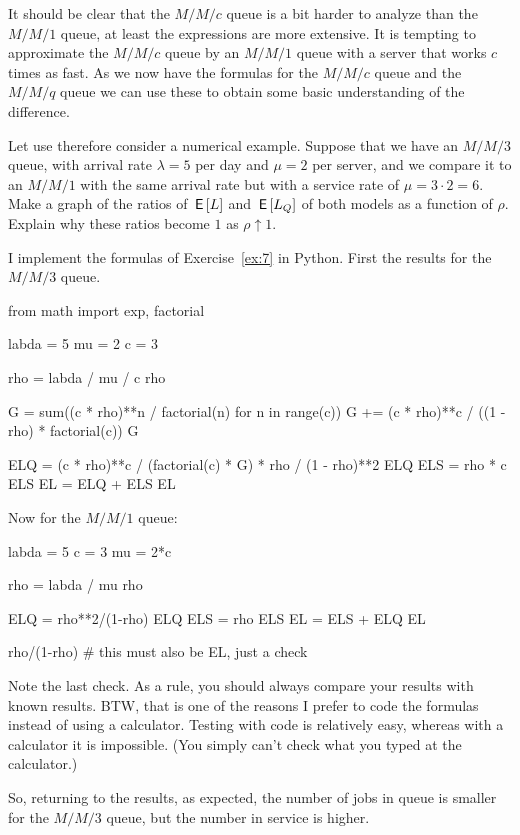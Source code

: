 \begin{exercise}\label{ex:27}
  It should be clear that the $M/M/c$ queue is a bit harder to analyze than the $M/M/1$ queue, at least the expressions are more extensive.
  It is tempting to approximate the $M/M/c$ queue by an $M/M/1$ queue with a server that works $c$ times as fast.
  As we now have the formulas for the $M/M/c$ queue and the $M/M/q$ queue we can use these to obtain some basic understanding of the difference.
  
  Let use therefore consider a numerical example.
  Suppose that we have an $M/M/3$ queue, with arrival rate $\lambda = 5$ per day and $\mu=2$ per server, and we compare it to an $M/M/1$ with the same arrival rate but with a service rate of $\mu = 3\cdot 2 = 6$.
  Make a graph of the ratios of $\,\mathsf{E}\left[L\right]$ and $\,\mathsf{E}\left[L_Q\right]$ of both models as a function of $\rho$.
  Explain why these ratios become $1$ as $\rho\uparrow 1$. 
  \begin{solution}
I implement the formulas of Exercise~\ref{ex:7} in Python. First the results for the $M/M/3$ queue.

\begin{pyconsole}
from math import exp, factorial

labda = 5
mu = 2
c = 3

rho = labda / mu / c
rho

G = sum((c * rho)**n / factorial(n) for n in range(c))
G += (c * rho)**c / ((1 - rho) * factorial(c))
G

ELQ = (c * rho)**c / (factorial(c) * G) * rho / (1 - rho)**2
ELQ
ELS = rho * c
ELS
EL = ELQ + ELS
EL
\end{pyconsole}

Now for the $M/M/1$ queue:

\begin{pyconsole}
labda = 5
c = 3
mu = 2*c

rho = labda / mu 
rho

ELQ = rho**2/(1-rho)
ELQ
ELS = rho
ELS
EL = ELS + ELQ
EL

rho/(1-rho) # this must also be EL, just a check
\end{pyconsole}

Note the last check. As a rule, you should always compare your results
with known results. BTW, that is one of the reasons I prefer to code
the formulas instead of using a calculator. Testing with code is
relatively easy, whereas with a calculator it is impossible. (You
simply can't check what you typed at the calculator.)

So, returning to the results, as expected, the number of jobs in queue
is smaller for the $M/M/3$ queue, but the number in service is higher.


\end{solution}
\end{exercise}
